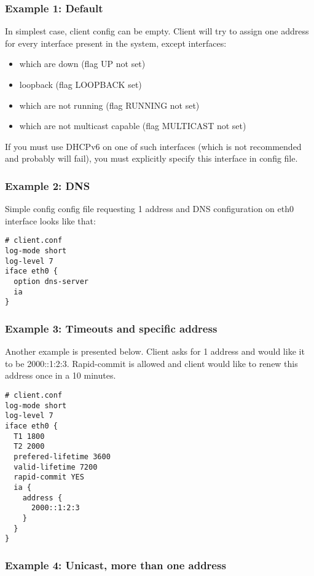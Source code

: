 \subsubsection{Example 1: Default}

In simplest case, client config can be empty. Client will try to
assign one address for every interface present in the system, except
interfaces:
\begin{itemize}
\item which are down (flag UP not set)
\item loopback (flag LOOPBACK set)
\item which are not running (flag RUNNING not set)
\item which are not multicast capable (flag MULTICAST not set)
\end{itemize}

If you must use DHCPv6 on one of such interfaces (which is not
recommended and probably will fail), you must explicitly specify this
interface in config file.

\subsubsection{Example 2: DNS}

Simple config config file requesting 1 address and DNS configuration
on eth0 interface looks like that:
\begin{verbatim}
# client.conf
log-mode short
log-level 7
iface eth0 {
  option dns-server
  ia
}
\end{verbatim}

\subsubsection{Example 3: Timeouts and specific address}

Another example is presented below. Client asks for 1 address and
would like it to be 2000::1:2:3. Rapid-commit is allowed and client
would like to renew this address once in a 10 minutes.

\begin{verbatim}
# client.conf
log-mode short
log-level 7
iface eth0 {
  T1 1800
  T2 2000
  prefered-lifetime 3600
  valid-lifetime 7200
  rapid-commit YES
  ia {
    address { 
      2000::1:2:3
    }
  }
}
\end{verbatim}

\subsubsection{Example 4: Unicast, more than one address}

